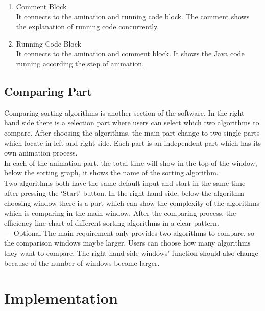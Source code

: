 \documentclass[paper=a4, fontsize=11pt,twoside]{scrartcl}		%
\begin{document}
\begin{enumerate}
\item Comment Block \\It connects to the amination and running code block. The comment shows the explanation of running code concurrently. 

\item Running Code Block \\It connects to the amination and comment block. It shows the Java code running according the step of animation.
\end{enumerate}


\subsection{Comparing Part}

Comparing sorting algorithms is another section of the software. In the right hand side there is a selection part where users can select which two algorithms to compare. After choosing the algorithms, the main part change to two single parts which locate in left and right side. Each part is an independent part which has its own animation process.\\

In each of the animation part, the total time will show in the top of the window, below the sorting graph, it shows the name of the sorting algorithm.\\

Two algorithms both have the same default input and start in the same time after pressing the ‘Start’ button. In the right hand side, below the algorithm choosing window there is a part which can show the complexity of the algorithms which is comparing in the main window. After the comparing process, the efficiency line chart of different sorting algorithms in a clear pattern.\\

— Optional
The main requirement only provides two algorithms to compare, so the comparison windows maybe larger. Users can choose how many algorithms they want to compare. The right hand side windows’ function should also change because of the number of windows become larger.
\section{Implementation}
\clearpage

\end{document}
